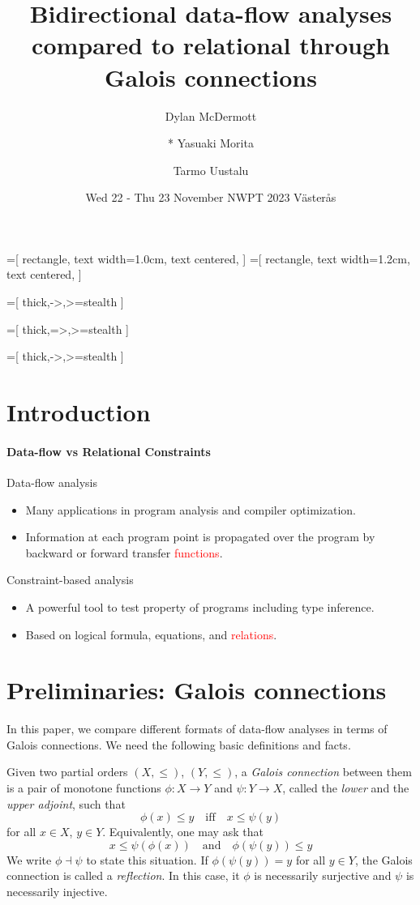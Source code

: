 \documentclass{llncs}
\title{Bidirectional data-flow analyses compared to relational through Galois connections}
\author{
  Dylan McDermott
\and
  * Yasuaki Morita
\and
  Tarmo Uustalu
}
\institute{Reykjavik University}
\date{Wed 22 - Thu 23 November NWPT 2023 V{\"a}ster{\aa}s }
\newcommand{\red}[1]{\textcolor{red}{#1}}
\begin{document}
\usetikzlibrary{shapes,arrows}

=[
  rectangle,
  text width=1.0cm,
  text centered,
]
=[
  rectangle,
  text width=1.2cm,
  text centered,
]

=[
  thick,->,>=stealth
]

=[
  thick,=>,>=stealth
]

=[
  thick,->,>=stealth
]


  
\section{Introduction}

\paragraph{Data-flow vs Relational Constraints}
Data-flow analysis
    \begin{itemize}
    \item Many applications in program analysis and compiler optimization.
    \item Information at each program point is propagated over the program by backward or forward transfer \red{functions}.
    \end{itemize}


Constraint-based analysis
    \begin{itemize}
    \item A powerful tool to test property of programs including type inference.
    \item Based on logical formula, equations, and \red{relations}.
    \end{itemize}


\section{Preliminaries: Galois connections}

In this paper, we compare different formats of data-flow analyses in
terms of Galois connections. We need the following basic definitions
and facts.

Given two partial orders $(X, \leq)$, $(Y, \leq)$, a \emph{Galois
  connection} between them is a pair of monotone functions
$\phi : X \to Y$ and $\psi : Y \to X$, called the \emph{lower} and the
\emph{upper adjoint}, such that
\[
\phi(x) \leq y \quad \mathrm{iff} \quad  x \leq \psi(y)
\]
for all $x \in X$, $y \in Y$. Equivalently, one may ask that
\[
x \leq \psi(\phi(x)) \quad \mathrm{and} \quad \phi(\psi(y)) \leq y 
\]
We write $\phi \dashv \psi$ to state this situation.  If
$\phi(\psi(y)) = y$ for all $y \in Y$, the Galois connection is called
a \emph{reflection}. In this case, it $\phi$ is necessarily surjective
and $\psi$ is necessarily injective.
\end{document}
